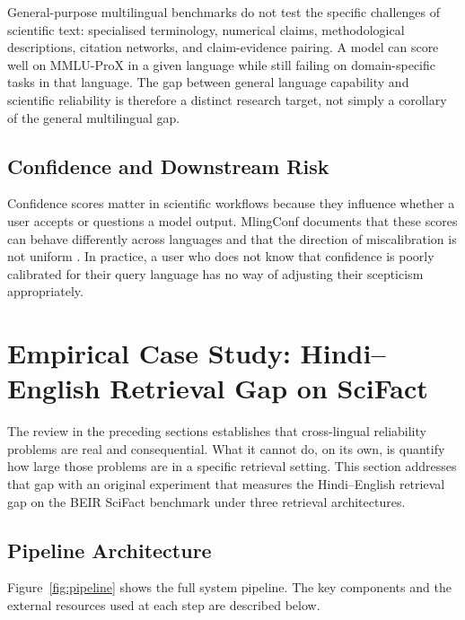 \documentclass[acmsmall,screen,review]{acmart}
\begin{document}
General-purpose multilingual benchmarks do not test the specific
challenges of scientific text: specialised terminology, numerical claims,
methodological descriptions, citation networks, and claim-evidence
pairing.  A model can score well on MMLU-ProX in a given language while
still failing on domain-specific tasks in that language.  The gap between
general language capability and scientific reliability is therefore a
distinct research target, not simply a corollary of the general
multilingual gap.

\subsection{Confidence and Downstream Risk}
\label{sec:confidence-risk}

Confidence scores matter in scientific workflows because they influence
whether a user accepts or questions a model output.  MlingConf documents
that these scores can behave differently across languages and that the
direction of miscalibration is not uniform \citep{xue2024mlingconf}.  In
practice, a user who does not know that confidence is poorly calibrated
for their query language has no way of adjusting their scepticism
appropriately.


\section{Empirical Case Study: Hindi--English Retrieval Gap on SciFact}
\label{sec:empirical}

The review in the preceding sections establishes that cross-lingual
reliability problems are real and consequential.  What it cannot do, on
its own, is quantify how large those problems are in a specific
retrieval setting.  This section addresses that gap with an original
experiment that measures the Hindi--English retrieval gap on the BEIR
SciFact benchmark under three retrieval architectures.

\subsection{Pipeline Architecture}
\label{sec:pipeline}

Figure~\ref{fig:pipeline} shows the full system pipeline.  The key
components and the external resources used at each step are described
below.
\end{document}
